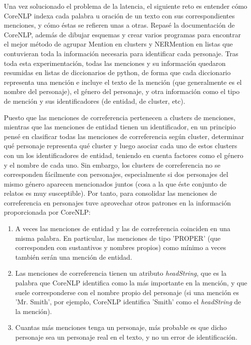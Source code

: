 \documentclass{pre-tfg}
\begin{document}
Una vez solucionado el problema de la latencia, el siguiente reto es entender cómo CoreNLP indexa cada palabra u oración de un texto con sus correspondientes menciones, y cómo éstas se refieren unas a otras. Repasé la documentación de CoreNLP, además de dibujar esquemas y crear varios programas para encontrar el mejor método de agrupar Mention en clusters y NERMention en listas que contuvieran toda la información necesaria para identificar cada personaje. Tras toda esta experimentación, todas las menciones y su información quedaron resumidas en listas de diccionarios de python, de forma que cada diccionario representa una mención e incluye el texto de la mención (que generalmente es el nombre del personaje), el género del personaje, y otra información como el tipo de mención y sus identificadores (de entidad, de cluster, etc).

Puesto que las menciones de correferencia pertenecen a clusters de menciones, mientras que las menciones de entidad tienen un identificador, en un principio pensé en clasificar todas las menciones de correferencia según cluster, determinar qué personaje representa qué cluster y luego asociar cada uno de estos clusters con un los identificadores de entidad, teniendo en cuenta factores como el género y el  nombre de cada uno.
Sin embargo, los clusters de correferencia no se corresponden fácilmente con personajes, especialmente si dos personajes del mismo género aparecen mencionados juntos (cosa a la que éste conjunto de relatos es muy susceptible). Por tanto, para consolidar las menciones de correferencia en personajes tuve aprovechar otros patrones en la información proporcionada por CoreNLP:

\begin{enumerate}
	\item A veces las menciones de entidad y las de correferencia coinciden en una misma palabra. En particular, las menciones de tipo 'PROPER' (que corresponden con sustantivos y nombres propios) como mínimo a veces también serán una mención de entidad.
	\item Las menciones de correferencia tienen un atributo \textit{headString}, que es la palabra que CoreNLP identifica como la más importante en la mención, y que suele corresponderse con el nombre propio del personaje (si una mención es 'Mr. Smith', por ejemplo, CoreNLP identifica 'Smith' como el \textit{headString} de la mención).
	\item Cuantas más menciones tenga un personaje, más probable es que dicho personaje sea un personaje real en el texto, y no un error de identificación.
\end{enumerate}
\end{document}
